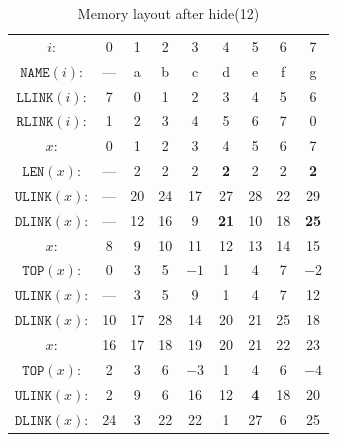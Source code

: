 \documentclass[a4paper,landscape,11pt]{article}
\begin{document}
\begin{table}[h!]
	\begin{center}
		\caption{Memory layout after hide(12)}
		\begin{tabular}{c c c c c c c c c }
			\hline
			$i$:                 & 0   & 1          & 2    & 3    & 4           & 5          & 6    & 7           \\
			$\texttt{NAME}(i)$:  & --- & a          & b    & c    & d           & e          & f    & g           \\
			$\texttt{LLINK}(i)$: & 7   & 0          & 1    & 2    & 3           & 4          & 5    & 6           \\
			$\texttt{RLINK}(i)$: & 1   & 2          & 3    & 4    & 5           & 6          & 7    & 0           \\
			\hline
			$x$:                 & 0   & 1          & 2    & 3    & 4           & 5          & 6    & 7           \\
			$\texttt{LEN}(x)$:   & --- & 2          & 2    & 2    & \textbf{2}  & 2          & 2    & \textbf{2}  \\
			$\texttt{ULINK}(x)$: & --- & 20         & 24   & 17   & 27          & 28         & 22   & 29          \\
			$\texttt{DLINK}(x)$: & --- & 12         & 16   & 9    & \textbf{21} & 10         & 18   & \textbf{25} \\
			\hline
			$x$:                 & 8   & 9          & 10   & 11   & 12          & 13         & 14   & 15          \\
			$\texttt{TOP}(x)$:   & 0   & 3          & 5    & $-1$ & 1           & 4          & 7    & $-2$        \\
			$\texttt{ULINK}(x)$: & --- & 3          & 5    & 9    & 1           & 4          & 7    & 12          \\
			$\texttt{DLINK}(x)$: & 10  & 17         & 28   & 14   & 20          & 21         & 25   & 18          \\
			\hline
			$x$:                 & 16  & 17         & 18   & 19   & 20          & 21         & 22   & 23          \\
			$\texttt{TOP}(x)$:   & 2   & 3          & 6    & $-3$ & 1           & 4          & 6    & $-4$        \\
			$\texttt{ULINK}(x)$: & 2   & 9          & 6    & 16   & 12          & \textbf{4} & 18   & 20          \\
			$\texttt{DLINK}(x)$: & 24  & 3          & 22   & 22   & 1           & 27         & 6    & 25          \\

\end{tabular}
\end{center}
\end{table}
\end{document}
